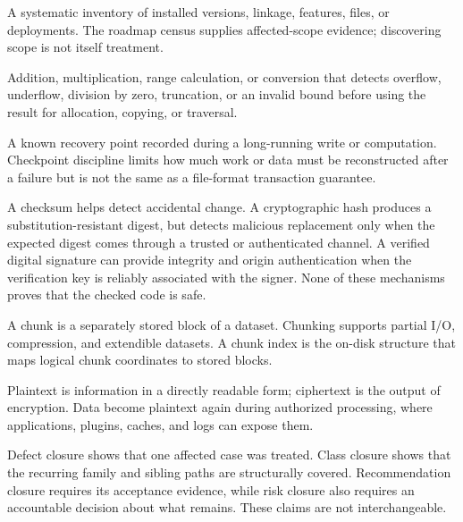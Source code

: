 \documentclass[../main.tex]{subfiles}
\begin{document}
\begin{description}[leftmargin=1.5em,style=nextline]
\item[Census.]
A systematic inventory of installed versions, linkage, features, files, or
deployments. The roadmap census supplies affected-scope evidence; discovering
scope is not itself treatment.

\item[Checked arithmetic.]
Addition, multiplication, range calculation, or conversion that detects
overflow, underflow, division by zero, truncation, or an invalid bound before
using the result for allocation, copying, or traversal.

\item[Checkpoint.]
A known recovery point recorded during a long-running write or computation.
Checkpoint discipline limits how much work or data must be reconstructed after
a failure but is not the same as a file-format transaction guarantee.

\item[Checksum / cryptographic hash / digital signature.]
A checksum helps detect accidental change. A cryptographic hash produces a
substitution-resistant digest, but detects malicious replacement only when the
expected digest comes through a trusted or authenticated channel. A verified
digital signature can provide integrity and origin authentication when the
verification key is reliably associated with the signer. None of these
mechanisms proves that the checked code is safe.

\item[Chunk / chunked storage / chunk index.]
A chunk is a separately stored block of a dataset. Chunking supports partial
I/O, compression, and extendible datasets. A chunk index is the on-disk
structure that maps logical chunk coordinates to stored blocks.

\item[Ciphertext / plaintext.]
Plaintext is information in a directly readable form; ciphertext is the output
of encryption. Data become plaintext again during authorized processing, where
applications, plugins, caches, and logs can expose them.

\item[Closure: defect, class, recommendation, and risk.]
Defect closure shows that one affected case was treated. Class closure shows
that the recurring family and sibling paths are structurally covered.
Recommendation closure requires its acceptance evidence, while risk closure
also requires an accountable decision about what remains. These claims are not
interchangeable.


\end{description}
\end{document}
